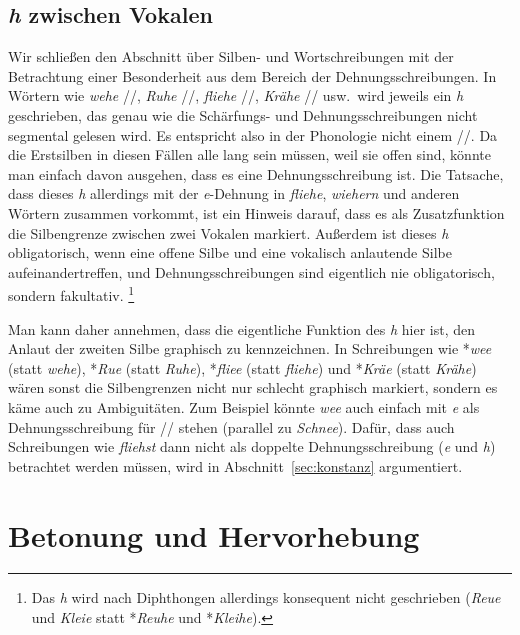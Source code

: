 \subsection{\textit{h} zwischen Vokalen}

\label{sec:intervokh}

Wir schließen den Abschnitt über Silben- und Wortschreibungen mit der Betrachtung einer Besonderheit aus dem Bereich der Dehnungsschreibungen.
In Wörtern wie \textit{wehe} //, \textit{Ruhe} //, \textit{fliehe} //, \textit{Krähe} // usw.\ wird jeweils ein \textit{h} geschrieben, das genau wie die Schärfungs- und Dehnungsschreibungen nicht segmental gelesen wird.
Es entspricht also in der Phonologie nicht einem //.
Da die Erstsilben in diesen Fällen alle lang sein müssen, weil sie offen sind, könnte man einfach davon ausgehen, dass es eine Dehnungsschreibung ist.
Die Tatsache, dass dieses \textit{h} allerdings mit der \textit{e}-Dehnung in \textit{fliehe}, \textit{wiehern} und anderen Wörtern zusammen vorkommt, ist ein Hinweis darauf, dass es als Zusatzfunktion die Silbengrenze zwischen zwei Vokalen markiert.
Außerdem ist dieses \textit{h} obligatorisch, wenn eine offene Silbe und eine vokalisch anlautende Silbe aufeinandertreffen, und Dehnungsschreibungen sind eigentlich nie obligatorisch, sondern fakultativ.%
\footnote{Das \textit{h} wird nach Diphthongen allerdings konsequent nicht geschrieben (\zB \textit{Reue} und \textit{Kleie} statt *\textit{Reuhe} und *\textit{Kleihe}).}

Man kann daher annehmen, dass die eigentliche Funktion des \textit{h} hier ist, den Anlaut der zweiten Silbe graphisch zu kennzeichnen.
In Schreibungen wie *\textit{wee} (statt \textit{wehe}), *\textit{Rue} (statt \textit{Ruhe}), *\textit{fliee} (statt \textit{fliehe}) und *\textit{Kräe} (statt \textit{Krähe}) wären sonst die Silbengrenzen nicht nur schlecht graphisch markiert, sondern es käme auch zu Ambiguitäten.
Zum Beispiel könnte \textit{wee} auch einfach mit \textit{e} als Dehnungsschreibung für // stehen (parallel zu \textit{Schnee}).
Dafür, dass auch Schreibungen wie \textit{fliehst} dann nicht als doppelte Dehnungsschreibung (\textit{e} und \textit{h}) betrachtet werden müssen, wird in Abschnitt~\ref{sec:konstanz} argumentiert.


\section{Betonung und Hervorhebung}


